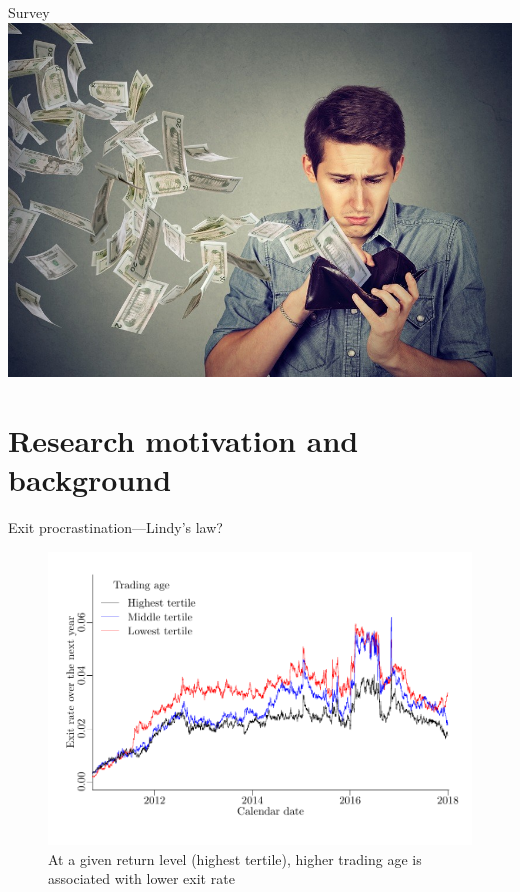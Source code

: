 \documentclass{beamer}
\begin{document}
\begin{frame}[allowframebreaks]{Survey}
	\includegraphics[scale=0.2]{figures/sadmoney}

\end{frame}


\section{Research motivation and background}

\begin{frame}{Exit procrastination---Lindy's law?}

	\begin{figure}
	\includegraphics[width=0.85\linewidth,trim={10 30 0 0},clip]{figures/exitTS-3}
	\caption{At a given return level (highest tertile), higher trading age is associated with lower exit rate}
	\end{figure}

\end{frame}
\end{document}
